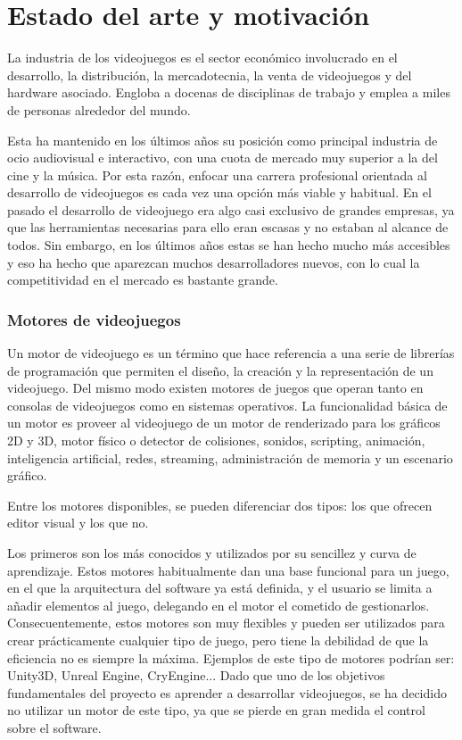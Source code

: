 	\section{Estado del arte y motivación}

		La industria de los videojuegos es el sector económico involucrado en el desarrollo, la distribución, la mercadotecnia, la venta de videojuegos y del hardware asociado. Engloba a docenas de disciplinas de trabajo y emplea a miles de personas alrededor del mundo.

		Esta ha mantenido en los últimos años su posición como principal industria de ocio audiovisual e interactivo, con una cuota de mercado muy superior a la del cine y la música. Por esta razón, enfocar una carrera profesional orientada al desarrollo de videojuegos es cada vez una opción más viable y habitual. En el pasado el desarrollo de videojuego era algo casi exclusivo de grandes empresas, ya que las herramientas necesarias para ello eran escasas y no estaban al alcance de todos. Sin embargo, en los últimos años estas se han hecho mucho más accesibles y eso ha hecho que aparezcan muchos desarrolladores nuevos, con lo cual la competitividad en el mercado es bastante grande.

		\subsubsection{Motores de videojuegos}

			Un motor de videojuego es un término que hace referencia a una serie de librerías de programación que permiten el diseño, la creación y la representación de un videojuego. Del mismo modo existen motores de juegos que operan tanto en consolas de videojuegos como en sistemas operativos. La funcionalidad básica de un motor es proveer al videojuego de un motor de renderizado para los gráficos 2D y 3D, motor físico o detector de colisiones, sonidos, scripting, animación, inteligencia artificial, redes, streaming, administración de memoria y un escenario gráfico.

			Entre los motores disponibles, se pueden diferenciar dos tipos: los que ofrecen editor visual y los que no.

			Los primeros son los más conocidos y utilizados por su sencillez y curva de aprendizaje. Estos motores habitualmente dan una base funcional para un juego, en el que la arquitectura del software ya está definida, y el usuario se limita a añadir elementos al juego, delegando en el motor el cometido de gestionarlos. Consecuentemente, estos motores son muy flexibles y pueden ser utilizados para crear prácticamente cualquier tipo de juego, pero tiene la debilidad de que la eficiencia no es siempre la máxima. Ejemplos de este tipo de motores podrían ser: Unity3D, Unreal Engine, CryEngine... Dado que uno de los objetivos fundamentales del proyecto es aprender a desarrollar videojuegos, se ha decidido no utilizar un motor de este tipo, ya que se pierde en gran medida el control sobre el software.

